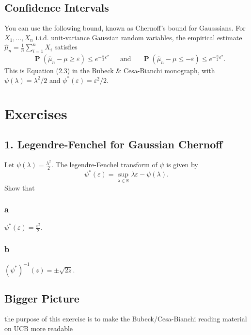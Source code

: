 \documentclass[10pt, a4paper, twoside]{amsart}
\theoremstyle{plain}
\newcommand{\R}{\ensuremath{\mathbb{R}}}
\renewcommand{\P}{\operatorname*{\ensuremath{\mathbf{P}}}} %
\begin{document}
\subsection{Confidence Intervals}
You can use the following bound, known as Chernoff's bound for Gausssians.
For $X_1,\ldots ,X_n$ i.i.d. unit-variance Gaussian random variables, the empirical estimate $\hat{\mu}_n = \frac{1}{n} \sum _{i=1}^n X_i$ satisfies
\begin{align*}
    & \P(\hat{\mu}_n - \mu \geq \varepsilon) \leq e^{-\tfrac{n}{2}\varepsilon^2} && \mbox{and} && \P(\hat{\mu}_n - \mu \leq -\varepsilon) \leq e^{-\tfrac{n}{2}\varepsilon^2}.
\end{align*}
This is Equation (2.3) in the Bubeck \& Cesa-Bianchi monograph, with $\psi (\lambda) = \lambda^2/2$ and $\psi^* (\varepsilon) = \varepsilon^2/2$.
\section{Exercises}
\subsection*{1. Legendre-Fenchel for Gaussian Chernoff}
Let $\psi(\lambda) = \frac{\lambda^2}{2}$. The legendre-Fenchel transform of $\psi$ is given by
\begin{equation*}
    \psi^*(\varepsilon) = \sup_{\lambda \in \R}\lambda \varepsilon - \psi(\lambda).
\end{equation*}
Show that
\subsubsection*{a}
$\psi^*(\varepsilon) = \frac{\varepsilon^2}{2}$.
\subsubsection*{b}
$(\psi^*)^{-1}(z) = \pm \sqrt{2z}$.
\subsection*{Bigger Picture} the purpose of this exercise is to make the Bubeck/Cesa-Bianchi reading material on UCB more readable
\end{document}
